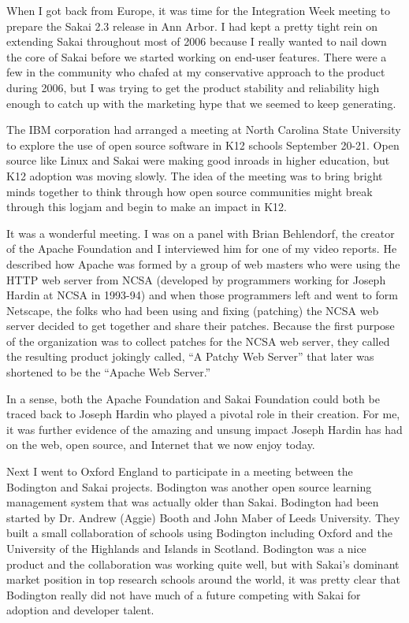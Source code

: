 \documentclass[12pt]{book}
\begin{document}

When I got back from Europe, it was time for the
Integration Week meeting to prepare the Sakai 2.3 release
in Ann Arbor.  I had kept a pretty tight rein
on extending Sakai throughout most of 2006 because
I really wanted to nail down the core of Sakai before
we started working on end-user features.
There were a few in the community who chafed at my
conservative approach to the product during 2006,
but I was trying to get the product stability and reliability
high enough to catch up with the marketing hype that
we seemed to keep generating.


The IBM corporation had arranged a meeting at North Carolina
State University to explore the use of open source software
in K12 schools September 20-21.  Open source like Linux and
Sakai were making good inroads in higher education, but K12
adoption was moving slowly.  The idea of the meeting
was to bring bright minds together to think through how
open source communities might break through this logjam
and begin to make an impact in K12.

It was a wonderful meeting. I was on a panel with Brian Behlendorf,
the creator of the Apache Foundation and I interviewed him
for one of my video reports.  He described how Apache was formed
by a group of web masters who were using the HTTP web server
from NCSA (developed by programmers working for Joseph Hardin
at NCSA in 1993-94) and when those programmers left and went to
form Netscape, the folks who had been using and fixing (patching)
the NCSA web server decided to get together and share their
patches.   Because the first purpose of the organization was to
collect patches for the NCSA web server, they called the resulting
product jokingly called, ``A Patchy Web Server'' that later
was shortened to be the ``Apache Web Server.''

In a sense, both the Apache Foundation and Sakai Foundation could both
be traced back to Joseph Hardin who played a pivotal role in
their creation.  For me, it was further evidence of the amazing
and unsung impact Joseph Hardin has had on the web, open source, and
Internet that we now enjoy today.


Next I went to Oxford England to participate in a meeting
between the Bodington and Sakai projects.  Bodington was another
open source learning management system that was actually older than
Sakai.  Bodington had been started by Dr. Andrew (Aggie) Booth
and John Maber of Leeds University.   They built a small collaboration
of schools using Bodington including Oxford and the University of
the Highlands and Islands in Scotland.  Bodington was a nice product
and the collaboration was working quite well, but with Sakai's
dominant market position in top research schools around the world,
it was pretty clear that Bodington really did not have
much of a future competing with Sakai for adoption and developer talent.
\end{document}
